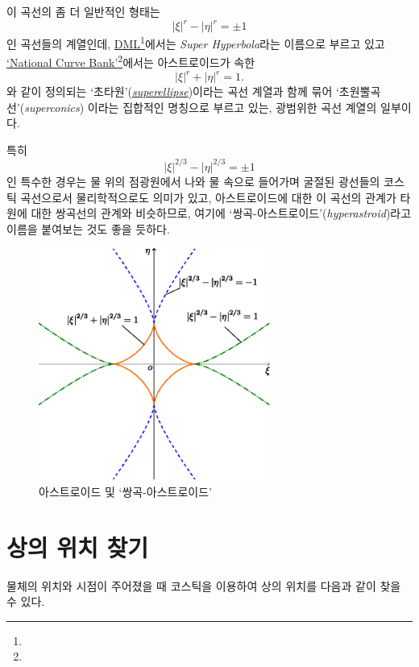 \documentclass[twocolumn]{article}
\begin{document}
이 곡선의 좀 더 일반적인 형태는 
$$ \left| \xi \right|^{r} - \left| \eta \right|^{r} = \pm1 $$
인 곡선들의 계열인데, \href{http://dynamicmathematicslearning.com/super-ellipse.html}%
{DML}\footnote{}에서는 \emph{Super Hyperbola}라는 이름으로 부르고 있고 
\href{https://old.nationalcurvebank.org/superconicncb/superconicncb.htm}{`National Curve Bank'}\footnote{}에서는
아스트로이드가 속한 
$$ \left| \xi \right|^{r} + \left| \eta \right|^{r} = 1. $$
와 같이 정의되는 `초타원'(\href{https://mathworld.wolfram.com/Astroid.html}%
{\emph{superellipse}})이라는 곡선 계열과 함께 묶어
`초원뿔곡선'(\emph{superconics}) 이라는 집합적인 명칭으로 부르고 있는, 광범위한 곡선 계열의 일부이다.

특히
$$ \left| \xi \right|^{2/3} - \left| \eta \right|^{2/3} = \pm1 $$
인 특수한 경우는 물 위의 점광원에서 나와 물 속으로 들어가며 굴절된 광선들의 코스틱 곡선으로서 
물리학적으로도 의미가 있고, 아스트로이드에 대한 이 곡선의 관계가 타원에 대한 쌍곡선의 관계와 
비슷하므로, 여기에 `쌍곡-아스트로이드'(\emph{hyperastroid})라고 이름을 붙여보는 것도 좋을 듯하다. 

\begin{figure}
	\centering
	\includegraphics[width=3in]{figs/g254.eps}
	\caption{아스트로이드 및 `쌍곡-아스트로이드'}
	\label{fig:hyperastroid}
\end{figure}

\section{상의 위치 찾기}
물체의 위치와 시점이 주어졌을 때 코스틱을 이용하여 상의 위치를 다음과 같이 찾을 수 있다.
\end{document}
